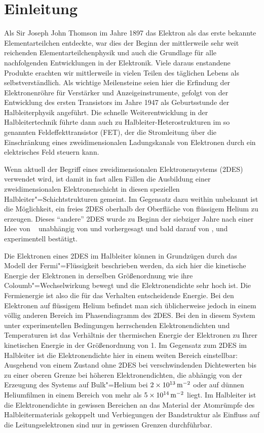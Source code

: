\chapter*{Einleitung}

Als Sir Joseph John Thomson im Jahre 1897 das Elektron als das erste bekannte Elementarteilchen entdeckte, war dies der Beginn der mittlerweile sehr weit reichenden Elementarteilchenphysik und auch die Grundlage für alle nachfolgenden Entwicklungen in der Elektronik. Viele daraus enstandene Produkte erachten wir mittlerweile in vielen Teilen des täglichen Lebens als selbstverständlich. Als wichtige Meilensteine seien hier die Erfindung der Elektronenröhre für Verstärker und Anzeigeinstrumente, gefolgt von der Entwicklung des ersten Transistors im Jahre 1947 als Geburtsstunde der Halbleiterphysik angeführt. Die schnelle Weiterentwicklung in der Halbleitertechnik führte dann auch zu Halbleiter-Heterostrukturen im so genannten Feldeffekttransistor (FET), der die Stromleitung über die Einschränkung eines zweidimensionalen Ladungskanals von Elektronen durch ein elektrisches Feld steuern kann. 

Wenn aktuell der Begriff eines zweidimensionalen Elektronensystems (2DES) verwendet wird, ist damit in fast allen Fällen die Ausbildung einer zweidimensionalen Elektronenschicht in diesen speziellen Halbleiter"=Schichtstrukturen gemeint. Im Gegensatz dazu weithin unbekannt ist die Möglichkeit, ein freies 2DES oberhalb der Oberfläche von flüssigem Helium zu erzeugen. Dieses "`andere"' 2DES wurde zu Beginn der siebziger Jahre nach einer Idee von ~\cite{Sho39} unabhängig von  \cite{Col69} und  \cite{Shi70} vorhergesagt und bald darauf von ,  und  \cite{Wil71} experimentell bestätigt.

Die Elektronen eines 2DES im Halbleiter können in Grundzügen durch das Modell der Fermi"=Flüssigkeit beschrieben werden, da sich hier die kinetische Energie der Elektronen in derselben Größenordnung wie ihre Coloumb"=Wechselwirkung bewegt und die Elektronendichte sehr hoch ist. Die Fermienergie ist also die für das Verhalten entscheidende Energie. Bei den Elektronen auf flüssigem Helium befindet man sich üblicherweise jedoch in einem völlig anderen Bereich im Phasendiagramm des 2DES. Bei den in diesem System unter experimentellen Bedingungen herrschenden Elektronendichten und Temperaturen ist das Verhältnis der thermischen Energie der Elektronen zu Ihrer kinetischen Energie in der Größenordnung von 1. Im Gegensatz zum 2DES im Halbleiter ist die Elektronendichte hier in einem weiten Bereich einstellbar: Ausgehend von einem Zustand ohne 2DES bei verschwindenden Dichtewerten bis zu einer oberen Grenze bei höheren Elektronendichten, die abhängig von der Erzeugung des Systems auf Bulk"=Helium bei $\unit[2\times10^{13}]{\Em}$ oder auf dünnen Heliumfilmen in einem Bereich von mehr als $\unit[5\times10^{14}]{\Em}$ liegt. Im Halbleiter ist die Elektronendichte in gewissen Bereichen an das Material der Atomrümpfe des Halbleitermaterials gekoppelt und Verbiegungen der Bandstruktur als Einfluss auf die Leitungselektronen sind nur in gewissen Grenzen durchführbar.


